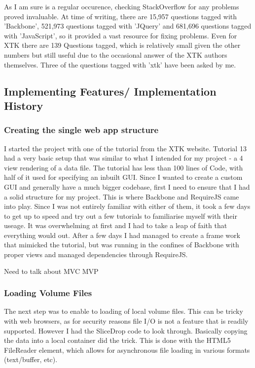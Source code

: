 \documentclass[a4paper,11pt,titlepage]{article}
\begin{document}
As I am sure is a regular occurence, checking StackOverflow for any problems proved invaluable. At time of writing, there are 15,957 questions tagged with 'Backbone', 521,973 questions tagged with 'JQuery' and 681,696 questions tagged with 'JavaScript', so it provided a vast resource for fixing problems. Even for XTK there are 139 Questions tagged, which is relatively small given the other numbers but still useful due to the occasional answer of the XTK authors themselves. Three of the questions tagged with 'xtk' have been asked by me.






\subsection{Implementing Features/ Implementation History}


\subsubsection{Creating the single web app structure}

I started the project with one of the tutorial from the XTK website. Tutorial 13 had a very basic setup that was similar to what I intended for my project - a 4 view rendering of a data file. The tutorial has less than 100 lines of Code, with half of it used for specifying an inbuilt GUI. Since I wanted to create a custom GUI and generally have a much bigger codebase, first I need to ensure that I had a solid structure for my project. This is where Backbone and RequireJS came into play. Since I was not entirely familiar with either of them, it took a few days to get up to speed and try out a few tutorials to familiarise myself with their useage. It was overwhelming at first and I had to take a leap of faith that everything would out. After a few days I had managed to create a frame work that mimicked the tutorial, but was running in the confines of Backbone with proper views and managed dependencies through RequireJS.

Need to talk about MVC MVP


\subsubsection{Loading Volume Files}

The next step was to enable to loading of local volume files. This can be tricky with web browsers, as for security reasons file I/O is not a feature that is readily supported. However I had the SliceDrop code to look through. Basically copying the data into a local container did the trick. This is done with the HTML5 FileReader element, which allows for asynchronous file loading in various formats (text/buffer, etc).
\end{document}
